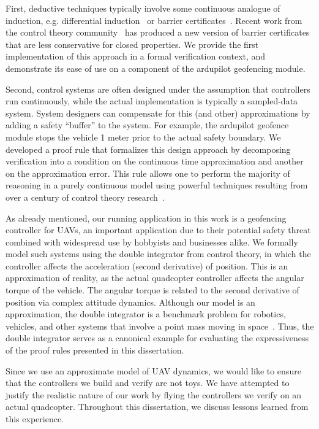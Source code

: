 \documentclass[12pt]{ucsddissertation}
\begin{document}
\begin{dissertationintroduction}
First, deductive techniques typically involve some continuous analogue of
induction, e.g. differential induction~\cite{Platzer10DAL} or barrier
certificates~\cite{prajna04barrier}. Recent work from the control theory
community~\cite{kong2013barrier,xu15barrier,nguyen16barrier} has produced a
new version of barrier certificates that are less conservative for closed
properties. We provide the first implementation of this approach in a
formal verification context, and demonstrate its ease of use on a component
of the ardupilot geofencing module.

Second, control systems are often designed under the assumption that
controllers run continuously, while the actual implementation is typically
a sampled-data system. System designers can compensate for this (and other)
approximations by adding a safety ``buffer'' to the system. For example,
the ardupilot geofence module stops the vehicle 1 meter prior to the actual
safety boundary. We developed a proof rule that formalizes this design
approach by decomposing verification into a condition on the continuous
time approximation and another on the approximation error.  This rule
allows one to perform the majority of reasoning in a purely continuous
model using powerful techniques resulting from over a century of control
theory research~\cite{kong2013barrier,xu15barrier,nguyen16barrier}.

As already mentioned, our running application in this work is a geofencing
controller for UAVs, an important application due to their potential safety
threat combined with widespread use by hobbyists and businesses alike. We
formally model such systems using the double integrator from control
theory, in which the controller affects the acceleration (second
derivative) of position. This is an approximation of reality, as the actual
quadcopter controller affects the angular torque of the vehicle. The
angular torque is related to the second derivative of position via complex
attitude dynamics. Although our model is an approximation, the double
integrator is a benchmark problem for robotics, vehicles, and other systems
that involve a point mass moving in space~\cite{rao2001naive}. Thus, the
double integrator serves as a canonical example for evaluating the
expressiveness of the proof rules presented in this dissertation.

Since we use an approximate model of UAV dynamics, we would like to ensure
that the controllers we build and verify are not toys. We have attempted to
justify the realistic nature of our work by flying the controllers we
verify on an actual quadcopter. Throughout this dissertation, we discuss
lessons learned from this experience.


\end{dissertationintroduction}
\end{document}
